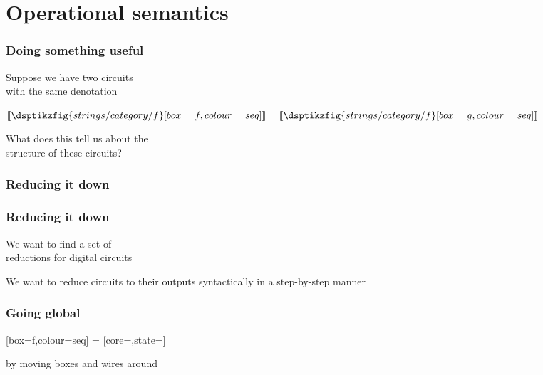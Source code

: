 \section{Operational semantics}

\begin{frame}
    \frametitle{Doing something useful}

    \centering

    \LARGE
    Suppose we have two circuits \\
    with the same denotation
    \normalsize

    \vspace{2em}

    \(
    \llbracket\dsptikzfig{strings/category/f}[box=f,colour=seq]\rrbracket
    =
    \llbracket\dsptikzfig{strings/category/f}[box=g,colour=seq]\rrbracket
    \)

    \vspace{2em}

    \LARGE
    \await
    What does this tell us about the \\
    \alert{structure} of these circuits?

\end{frame}
\begin{frame}
    \frametitle{Reducing it down}

    \await

    \centering


\end{frame}
\begin{frame}
    \frametitle{Reducing it down}

    \centering
    \LARGE

    We want to find a set of \\ \alert{reductions} for digital circuits


    \await
    We want to reduce circuits to their outputs \alert{syntactically}
    in a \alert{step-by-step} manner

\end{frame}
\begin{frame}
    \frametitle{Going global}

    \centering

    [box=f,colour=seq]
    \await
    \Large=\normalsize
    [core=,state=]

    \vspace{1em}
    \Large
    by moving boxes and wires around
\end{frame}

